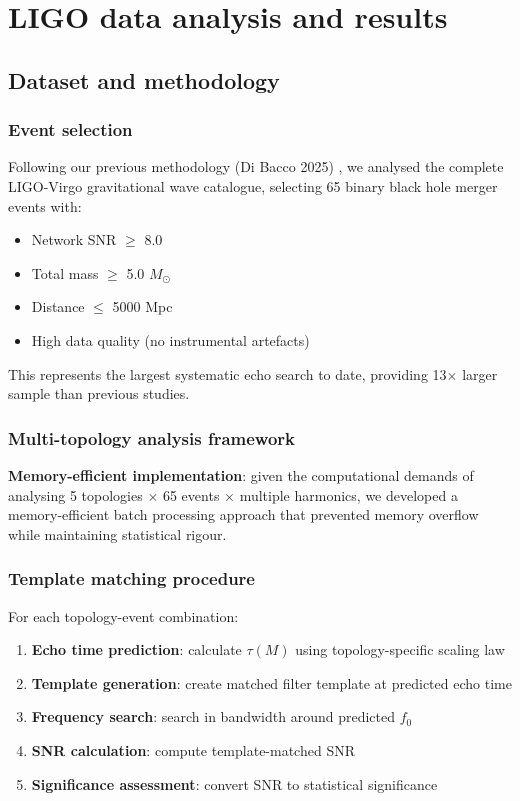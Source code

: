 \documentclass[12pt]{iopart}
\newcommand{\Msun}{M_{\odot}}
\begin{document}
\section{LIGO data analysis and results}

\subsection{Dataset and methodology}

\subsubsection{Event selection}

Following our previous methodology (Di Bacco 2025) \cite{dibacco2025}, we analysed the complete LIGO-Virgo gravitational wave catalogue, selecting 65 binary black hole merger events with:

\begin{itemize}
\item Network SNR $\geq$ 8.0
\item Total mass $\geq$ 5.0 $\Msun$
\item Distance $\leq$ 5000 Mpc
\item High data quality (no instrumental artefacts)
\end{itemize}

This represents the largest systematic echo search to date, providing 13$\times$ larger sample than previous studies.

\subsubsection{Multi-topology analysis framework}

\textbf{Memory-efficient implementation}: given the computational demands of analysing 5 topologies $\times$ 65 events $\times$ multiple harmonics, we developed a memory-efficient batch processing approach that prevented memory overflow while maintaining statistical rigour.

\subsubsection{Template matching procedure}

For each topology-event combination:
\begin{enumerate}
\item \textbf{Echo time prediction}: calculate $\tau(M)$ using topology-specific scaling law
\item \textbf{Template generation}: create matched filter template at predicted echo time
\item \textbf{Frequency search}: search in bandwidth around predicted $f_0$
\item \textbf{SNR calculation}: compute template-matched SNR
\item \textbf{Significance assessment}: convert SNR to statistical significance
\end{enumerate}
\end{document}
